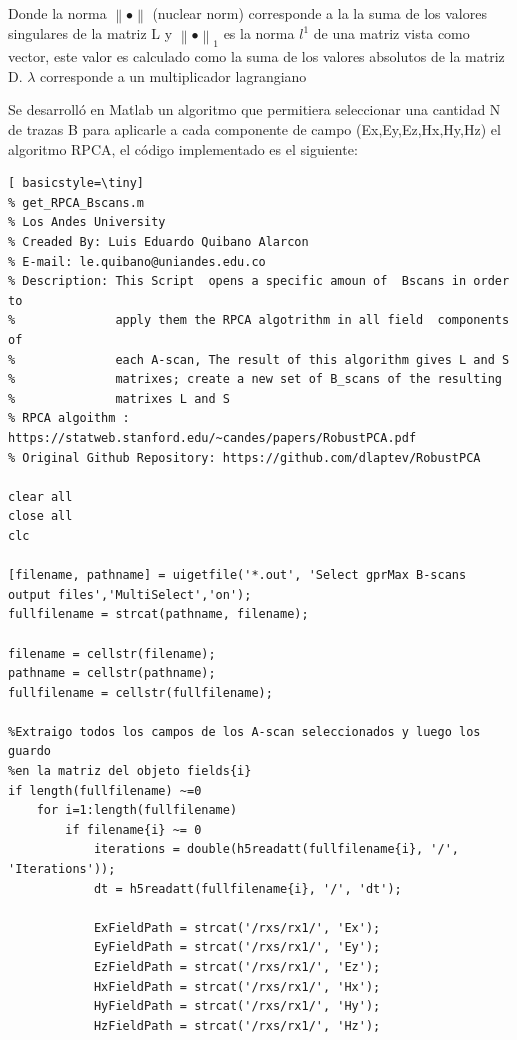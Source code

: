 Donde  la norma ${ \left\|  \bullet \right\|  }$ (nuclear norm) corresponde a la la suma de los valores singulares de la matriz L y ${ \left\|  \bullet  \right\|  }_{1}$ es la norma $l^1$ de una matriz vista como vector, este valor es calculado como la suma de los valores absolutos de la matriz D.  $\lambda $  corresponde a un multiplicador lagrangiano 


Se desarrolló en Matlab un algoritmo que permitiera seleccionar una cantidad N de trazas B para aplicarle a cada componente de campo (Ex,Ey,Ez,Hx,Hy,Hz) el algoritmo RPCA, el código implementado es el siguiente:

\begin{lstlisting}[ basicstyle=\tiny]
% get_RPCA_Bscans.m
% Los Andes University
% Creaded By: Luis Eduardo Quibano Alarcon
% E-mail: le.quibano@uniandes.edu.co
% Description: This Script  opens a specific amoun of  Bscans in order to
%              apply them the RPCA algotrithm in all field  components of
%              each A-scan, The result of this algorithm gives L and S
%              matrixes; create a new set of B_scans of the resulting
%              matrixes L and S
% RPCA algoithm : https://statweb.stanford.edu/~candes/papers/RobustPCA.pdf
% Original Github Repository: https://github.com/dlaptev/RobustPCA

clear all
close all
clc

[filename, pathname] = uigetfile('*.out', 'Select gprMax B-scans output files','MultiSelect','on');
fullfilename = strcat(pathname, filename);

filename = cellstr(filename);
pathname = cellstr(pathname);
fullfilename = cellstr(fullfilename);

%Extraigo todos los campos de los A-scan seleccionados y luego los guardo
%en la matriz del objeto fields{i}
if length(fullfilename) ~=0
    for i=1:length(fullfilename)
        if filename{i} ~= 0
            iterations = double(h5readatt(fullfilename{i}, '/', 'Iterations'));
            dt = h5readatt(fullfilename{i}, '/', 'dt');
            
            ExFieldPath = strcat('/rxs/rx1/', 'Ex');
            EyFieldPath = strcat('/rxs/rx1/', 'Ey');
            EzFieldPath = strcat('/rxs/rx1/', 'Ez');
            HxFieldPath = strcat('/rxs/rx1/', 'Hx');
            HyFieldPath = strcat('/rxs/rx1/', 'Hy');
            HzFieldPath = strcat('/rxs/rx1/', 'Hz');
            

\end{lstlisting}
